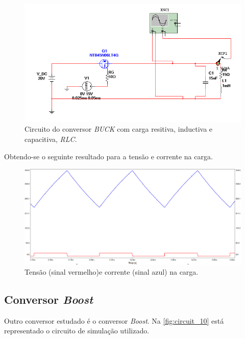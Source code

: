 \documentclass[a4paper,11pt]{article}
\numberwithin{equation}{section}
\begin{document}
\begin{figure}[h]
	\centering
	\includegraphics[keepaspectratio=true, scale=0.5]{img/circuito8}
	\caption{Circuito do conversor \textit{BUCK} com carga resitiva, inductiva e capacitiva, \textit{RLC}.}
	\label{fig:circuit_8}
	\vspace{-0.8em}
\end{figure}

Obtendo-se o seguinte resultado para a tensão e corrente na carga.

\begin{figure}[h]
	\centering
	\includegraphics[keepaspectratio=true, scale=0.35]{img/circuito9}
	\caption{Tensão (sinal vermelho)e corrente (sinal azul) na carga.}
	\label{fig:circuit_9}
	\vspace{-0.8em}
\end{figure}

\subsection{Conversor \textit{Boost}}

Outro conversor estudado é o conversor \textit{Boost}. Na \autoref{fig:circuit_10} está representado o circuito de simulação utilizado.
\end{document}
